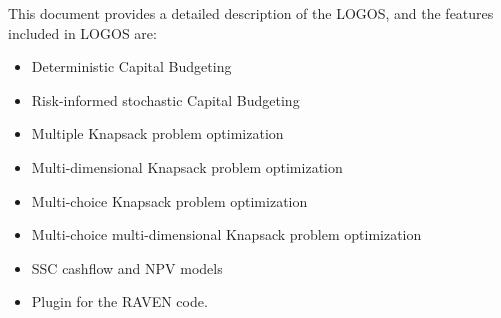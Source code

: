 This document provides a detailed description of the LOGOS, and the features included in LOGOS are:
\begin{itemize}
	\item Deterministic Capital Budgeting
	\item Risk-informed stochastic Capital Budgeting
	\item Multiple Knapsack problem optimization
	\item Multi-dimensional Knapsack problem optimization
	\item Multi-choice Knapsack problem optimization
	\item Multi-choice multi-dimensional Knapsack problem optimization
	\item SSC cashflow and NPV models
	\item Plugin for the RAVEN code.
\end{itemize}
